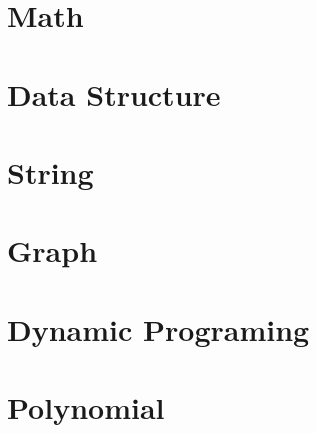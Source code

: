 \documentclass[a4paper,12pt,twoside,fontset=fandol,UTF8]{ctexbook}
\begin{document}
\chapter{Math}

\chapter{Data Structure}

\chapter{String}

\chapter{Graph}

\chapter{Dynamic Programing}

\chapter{Polynomial}

\end{document}
